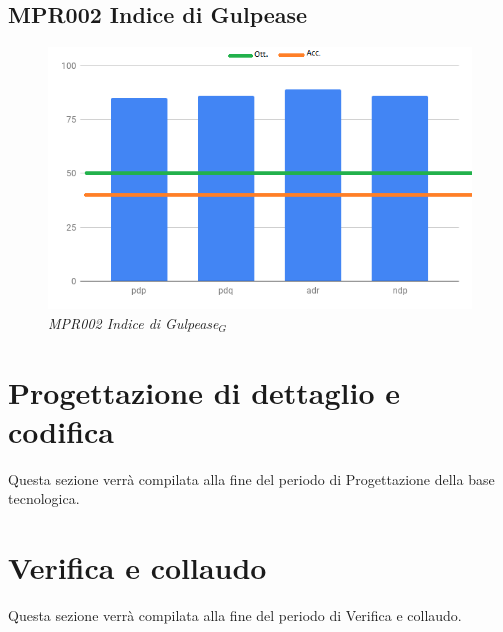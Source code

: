 \subsection{MPR002 Indice di Gulpease}
\begin{figure} [h]
    \centering
	\includegraphics[scale=0.5]{./images/gulpeaseP.png}
    \caption{\textit{MPR002 \textit{Indice di Gulpease$_{G}$}}}
\end{figure}
\newpage
\section{Progettazione di dettaglio e codifica}
Questa sezione verrà compilata alla fine del periodo di Progettazione della base tecnologica.
\section{Verifica e collaudo}
Questa sezione verrà compilata alla fine del periodo di Verifica e collaudo.